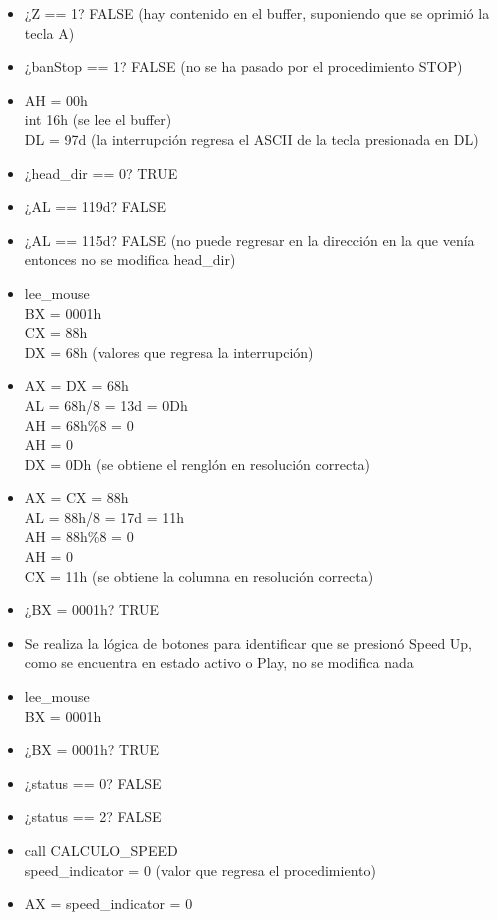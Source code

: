 \documentclass[12pt]{article}
\begin{document}
\begin{enumerate}
\begin{itemize}
        \item ¿Z == 1? FALSE (hay contenido en el buffer, suponiendo que se oprimió la tecla A)
        \item ¿banStop == 1? FALSE (no se ha pasado por el procedimiento STOP)
        \item AH = 00h \\ int 16h (se lee el buffer) \\ DL = 97d (la interrupción regresa el ASCII de la tecla presionada en DL)
        \item ¿head\_dir == 0? TRUE
        \item ¿AL == 119d? FALSE
        \item ¿AL == 115d? FALSE (no puede regresar en la dirección en la que venía entonces no se modifica head\_dir) 
        \item lee\_mouse \\ BX = 0001h\\ CX = 88h \\ DX = 68h (valores que regresa la interrupción)
        \item AX = DX = 68h \\ AL = 68h/8 = 13d = 0Dh \\ AH = 68h\%8 = 0 \\ AH = 0 \\DX = 0Dh (se obtiene el renglón en resolución correcta)
        \item AX = CX = 88h \\ AL = 88h/8 = 17d = 11h \\ AH = 88h\%8 = 0 \\ AH = 0 \\CX = 11h (se obtiene la columna en resolución correcta)
        \item ¿BX = 0001h? TRUE
        \item Se realiza la lógica de botones para identificar que se presionó Speed Up, como se encuentra en estado activo o Play, no se modifica nada
        \item lee\_mouse \\ BX = 0001h
        \item ¿BX = 0001h? TRUE
        \item ¿status == 0? FALSE
        \item ¿status == 2? FALSE
        \item call CALCULO\_SPEED \\ speed\_indicator = 0 (valor que regresa el procedimiento)
        \item AX = speed\_indicator = 0

\end{itemize}
\end{enumerate}
\end{document}
